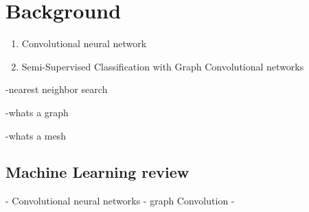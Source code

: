 \chapter{Background}
\label{sec:background}

\begin{enumerate}
    \item Convolutional neural network
    \item Semi-Supervised Classification with Graph Convolutional networks
\end{enumerate}
-nearest neighbor search

-whats a graph

-whats a mesh
\section{Machine Learning review}
- Convolutional neural networks
- graph Convolution
- 

\label{ml_review}


